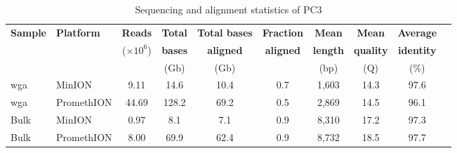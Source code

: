 \documentclass[pdflatex,sn-nature,lineno]{sn-jnl}%
\theoremstyle{thmstyleone}%
\theoremstyle{thmstyletwo}%
\theoremstyle{thmstylethree}%
\begin{document}
\backmatter


\makeatletter
\renewcommand{\theHfigure}{extended.\thefigure}
\renewcommand{\theHtable}{extended.\thetable}
\makeatother

\renewcommand{\figurename}{Extended Data Fig.}
\renewcommand{\tablename}{Extended Data Table}
\setcounter{figure}{0}
\setcounter{table}{0}

\begin{table}[!ht]
\centering
\caption{Sequencing and alignment statistics of PC3}
\label{tab:seq_stats}
\small
\setlength{\tabcolsep}{3pt} %
\begin{tabular}{@{}llcccccccc@{}}
\toprule
\textbf{Sample} & \textbf{Platform} & \textbf{Reads} & \textbf{Total} & \textbf{Total bases} & \textbf{Fraction} & \textbf{Mean} & \textbf{Mean} & \textbf{Average}\\
 & & ($\times 10^6$) & \textbf{bases} & \textbf{aligned} & \textbf{aligned} & \textbf{length} & \textbf{quality} & \textbf{identity}  \\
 & & & (Gb) & (Gb) & & (bp) & (Q) & (\%) \\
\midrule
\gls{wga} & MinION & 9.11 & 14.6 & 10.4 & 0.7 & 1,603 & 14.3 & 97.6 \\
\gls{wga} & PromethION & 44.69 & 128.2 & 69.2 & 0.5 & 2,869 & 14.5 & 96.1 \\
Bulk & MinION & 0.97 & 8.1 & 7.1 & 0.9 & 8,310 & 17.2 & 97.3 \\
Bulk & PromethION & 8.00 & 69.9 & 62.4 & 0.9 & 8,732 & 18.5 & 97.7 \\
\bottomrule
\end{tabular}
\end{table}
\end{document}
